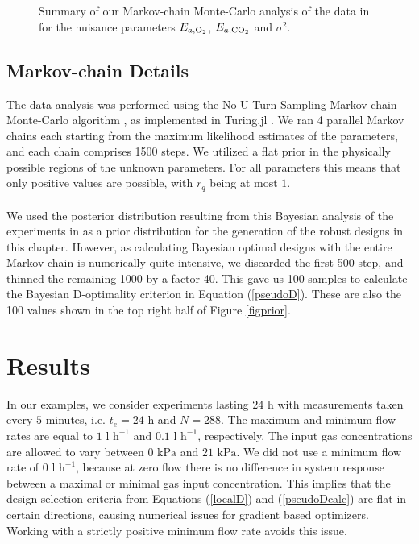 \begin{figure}[H]
\begin{subfigure}[b]{0.3\textwidth}
	\end{subfigure}
	\caption{Summary of our Markov-chain Monte-Carlo analysis of the data in \textcite{ho} for the nuisance parameters $E_{a,\text{O}_2}$, $E_{a,\text{CO}_2}$ and $\sigma^2$.}
	\label{fignuisance}
\end{figure}
\subsection{Markov-chain Details}
\label{sec_markov}
The data analysis was performed using the No U-Turn Sampling Markov-chain Monte-Carlo algorithm \parencite{hoffman}, as implemented in Turing.jl \parencite{ge}. We ran 4 parallel Markov chains each starting from the maximum likelihood estimates of the parameters, and each chain comprises 1500 steps. We utilized a flat prior in the physically possible regions of the unknown parameters. For all parameters this means that only positive values are possible, with $r_q$ being at most $1$.
\\
\\
We used the posterior distribution resulting from this Bayesian analysis of the experiments in \textcite{ho} as a prior distribution for the generation of the robust designs in this chapter. However, as calculating Bayesian optimal designs with the entire Markov chain is numerically quite intensive, we discarded the first 500 step, and thinned the remaining 1000 by a factor 40. This gave us 100 samples to calculate the Bayesian D-optimality criterion in Equation (\ref{pseudoD}). These are also the 100 values shown in the top right half of Figure \ref{figprior}.
\section{Results}
\label{sec_experiments}
In our examples, we consider experiments lasting $24$ h with measurements taken every $5$ minutes, i.e. $t_e = 24$ h and $N=288$. The maximum and minimum flow rates are equal to $1\text{ l h}^{-1}$ and $0.1\text{ l h}^{-1}$, respectively. The input gas concentrations are allowed to vary between $0 \text{ kPa}$ and $21\text{ kPa}$. We did not use a minimum flow rate of $0\text{ l h}^{-1}$, because at zero flow there is no difference in system response between a maximal or minimal gas input concentration. This implies that the design selection criteria from Equations (\ref{localD}) and (\ref{pseudoDcalc}) are flat in certain directions, causing numerical issues for gradient based optimizers. Working with a strictly positive minimum flow rate avoids this issue.
